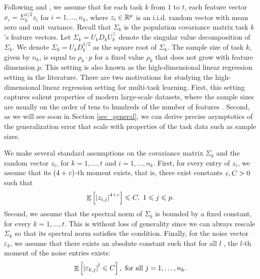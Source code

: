 Following \citet{HMRT19} and \citet{BLLT20},
we assume that for each task $k$ from $1$ to $t$, each feature vector $x_i = \Sigma^{1/2}_k z_i$ for $i = 1, \dots, n_k$, where $z_i\in\mathbb{R}^p$ is an i.i.d. random vector with  mean zero and unit variance.
Recall that $\Sigma_k$ is the population covariance matrix task $k$'s feature vectors.
Let $\Sigma_k = U_k D_k U_k^{\top}$ denote the singular value decomposition of $\Sigma_k$.
We denote $\Sigma_k = U_k D_k^{1/2}$ as the square root of $\Sigma_k$.
The sample size of task $k$, given by $n_k$, is equal to $\rho_k\cdot p$ for a fixed value $\rho_k$ that does not grow with feature dimension $p$.
This setting is also known as the high-dimensional linear regression setting in the literature.
There are two motivations for studying the high-dimensional linear regression setting for multi-task learning.
First, this setting captures salient properties of modern large-scale datasets, where the sample sizes are usually on the order of tens to hundreds of the number of features \cite{sur2019modern}.
Second, as we will see soon in Section \ref{sec_general}, we can derive precise asymptotics of the generalization error that scale with properties of the task data such as sample sizes.

We make several standard assumptions on the covariance matrix $\Sigma_k$ and the random vector $z_i$, for $k = 1,\dots, t$ and $i = 1,\dots, n_k$.
First, for every entry of $z_i$, we assume that its $(4+{\mathit{c}})$-th moment exists, that is, there exist constants ${\mathit{c}}, C > 0$ such that
\begin{equation}\label{assmAhigh}
	\mathop{\mathbb{E}}\left[ \left\lvert z_{i,j}\right\rvert^{4+{\mathit{c}}} \right] \leqslant C,\ 1\leqslant j \leqslant p.
\end{equation}
Second, we assume that the spectral norm of $\Sigma_k$ is bounded by a fixed constant, for every $k = 1,\dots, t$.
This is without loss of generality since we can always rescale $\Sigma_k$ so that its spectral norm satisfies the condition.
Finally, for the noise vector $\varepsilon_k$, we assume that there exists an absolute constant such that for all $l$ , the $l$-th moment of the noise entries exists:
\begin{align*}
	\mathop{\mathbb{E}}\left[ \left\lvert\varepsilon_{k, j}\right\rvert^l \leqslant C \right], \text{ for all } j = 1, \dots, n_k.
\end{align*}


